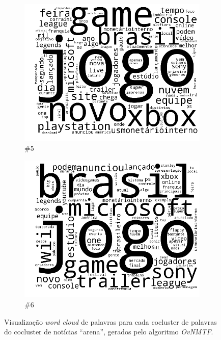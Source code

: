 \documentclass[
    12pt,                %
    oneside,            %
    a4paper,            %
    english,            %
    brazil                %
    ]{abntex2ppgsi}
\begin{document}
\begin{figure}[H]
\begin{subfigure}[b]{0.15\textwidth}
        \includegraphics[width=\textwidth]{img/ovnmtf-nc-1-tc-5.png}
        \caption{\#5}
    \end{subfigure}
    \begin{subfigure}[b]{0.15\textwidth}
        \includegraphics[width=\textwidth]{img/ovnmtf-nc-1-tc-6.png}
        \caption{\#6}
    \end{subfigure}

    \caption{Visualização \textit{word cloud} de palavras para cada cocluster de palavras do cocluster de notícias ``arena'', gerados pelo algoritmo \textit{OvNMTF}.}
    \label{fig:ovnmtf:wordcloud-1}
\end{figure}
\end{document}
